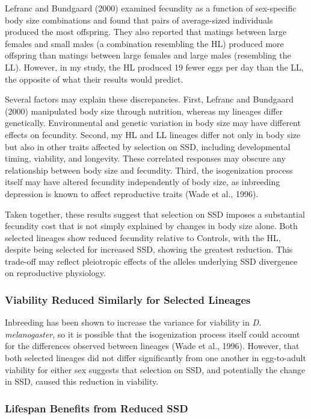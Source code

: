 \documentclass[12pt,reqno,oneside]{report}
\begin{document}
Lefranc and Bundgaard (2000) examined fecundity as a function of sex-specific body size combinations and found that pairs of average-sized individuals produced the most offspring. They also reported that matings between large females and small males (a combination resembling the HL) produced more offspring than matings between large females and large males (resembling the LL). However, in my study, the HL produced 19 fewer eggs per day than the LL, the opposite of what their results would predict.

Several factors may explain these discrepancies. First, Lefranc and Bundgaard (2000) manipulated body size through nutrition, whereas my lineages differ genetically. Environmental and genetic variation in body size may have different effects on fecundity. Second, my HL and LL lineages differ not only in body size but also in other traits affected by selection on SSD, including developmental timing, viability, and longevity. These correlated responses may obscure any relationship between body size and fecundity. Third, the isogenization process itself may have altered fecundity independently of body size, as inbreeding depression is known to affect reproductive traits (Wade et al., 1996).

Taken together, these results suggest that selection on SSD imposes a substantial fecundity cost that is not simply explained by changes in body size alone. Both selected lineages show reduced fecundity relative to Controls, with the HL, despite being selected for increased SSD, showing the greatest reduction. This trade-off may reflect pleiotropic effects of the alleles underlying SSD divergence on reproductive physiology.

\subsubsection{Viability Reduced Similarly for Selected Lineages}

Inbreeding has been shown to increase the variance for viability in \textit{D. melanogaster}, so it is possible that the isogenization process itself could account for the differences observed between lineages (Wade et al., 1996). However, that both selected lineages did not differ significantly from one another in egg-to-adult viability for either sex suggests that selection on SSD, and potentially the change in SSD, caused this reduction in viability.

\subsubsection{Lifespan Benefits from Reduced SSD}
\end{document}
